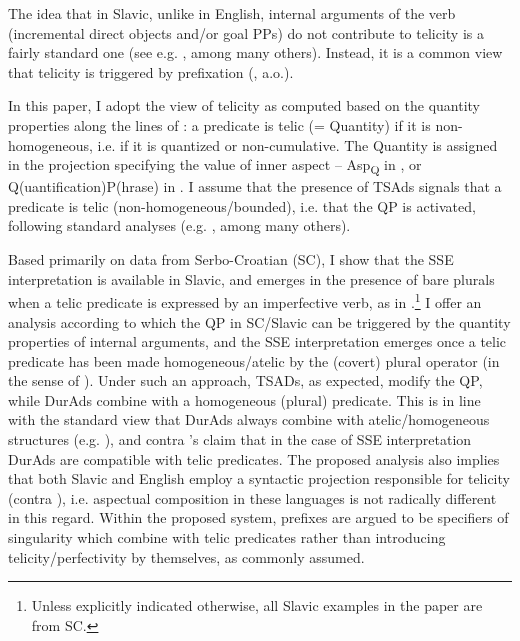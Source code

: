 \documentclass[output=paper,colorlinks,citecolor=brown]{langscibook}
\begin{document}
The idea that in Slavic, unlike in English, internal arguments of the verb (incremental direct objects and/or goal PPs) do not contribute to telicity is a fairly standard one (see e.g. \citealt{Łazorczyk2010, Rothstein2016, FleischhauerGabrovska2019}, among many others). Instead, it is a common view that telicity is triggered by prefixation (\citealt{ Borer_2005, Nossalik2007, Łazorczyk2010, Svenonius2004a, Svenonius2004b, Slabakova2005, Arsenijević2007b, Ramchand2008, FleischhauerGabrovska2019}, a.o.).

In this paper, I adopt the view of telicity as computed based on the quantity properties along the lines of \citet{Borer_2005}: a predicate is telic (= Quantity) if it is non-homogeneous, i.e. if it is quantized or non-cumulative. The Quantity is assigned in the projection specifying the value of inner aspect -- Asp\textsubscript{Q} in \citet{Borer_2005}, or Q(uantification)P(hrase) in \citet{Arsenijević2006book, Arsenijević2007a, Arsenijević2013}. I assume that the presence of TSAds signals that a predicate is telic (non-homogeneous\slash bounded), i.e. that the QP is activated, following standard analyses (e.g. \citealt{Krifka_1998, Borer_2005, Arsenijević2006book, MacDonald_2008, Mittwoch2010, Mittwoch2013, Mittwoch2019}, among many others). 

Based primarily on data from Serbo-Croatian (SC), I show that the SSE interpretation is available in Slavic, and emerges in the presence of bare plurals when a telic predicate is expressed by an imperfective verb, as in .\footnote{Unless explicitly indicated otherwise, all Slavic examples in the paper are from SC.} I offer an analysis according to which the QP in SC/Slavic can be triggered by the quantity properties of internal arguments, and the SSE interpretation emerges once a telic predicate has been made homogeneous/atelic by the (covert) plural operator (in the sense of \citealt{vanGeenhoven2004, vanGeenhoven2005, Arsenijević2006eah}). Under such an approach, TSADs, as expected, modify the QP, while DurAds combine with a homogeneous (plural) predicate. This is in line with the standard view that DurAds always combine with atelic/homogeneous structures (e.g. \citealt{Borer_2005, Csirmaz_2009, Mittwoch2010, LandmanRothstein2010, LandmanRothstein2012a, LandmanRothstein2012b}), and contra \citeauthor{MacDonald_2008}'s claim that in the case of SSE interpretation DurAds are compatible with telic predicates. The proposed analysis also implies that both Slavic and English employ a syntactic projection responsible for telicity (contra \citealt{MacDonald_2008}), i.e. aspectual composition in these languages is not radically different in this regard. Within the proposed system, prefixes are argued to be specifiers of singularity which combine with telic predicates rather than introducing telicity/perfectivity by themselves, as commonly assumed.
\end{document}
